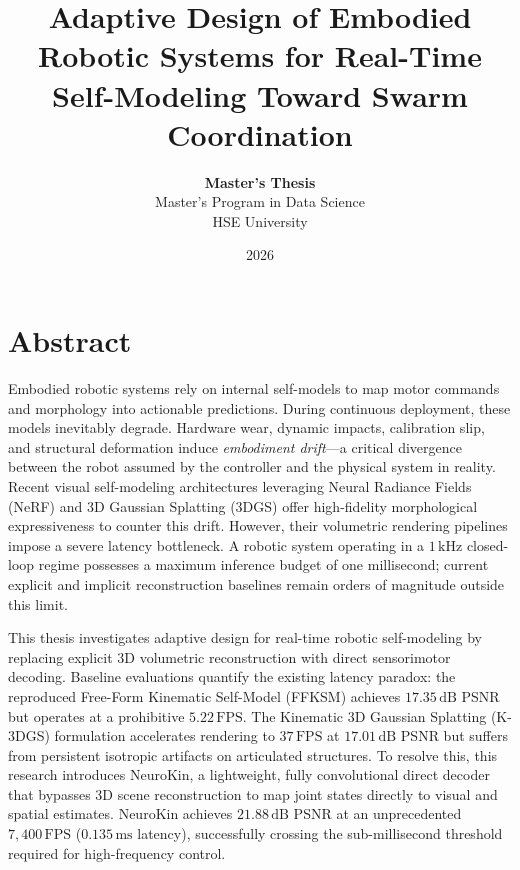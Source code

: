 \documentclass[12pt,a4paper,oneside]{report}
\title{
    \vspace{2cm}
    \textbf{\Large Adaptive Design of Embodied Robotic Systems for Real-Time Self-Modeling Toward Swarm Coordination}
    \vspace{1cm}
}
\author{
    \textbf{Master's Thesis} \\
    Master's Program in Data Science \\
    HSE University 
}
\date{\vspace{1cm} 2026}
\begin{document}
\maketitle
\clearpage
{}

\chapter*{Abstract}

Embodied robotic systems rely on internal self-models to map motor commands and morphology into actionable predictions. During continuous deployment, these models inevitably degrade. Hardware wear, dynamic impacts, calibration slip, and structural deformation induce \textit{embodiment drift}---a critical divergence between the robot assumed by the controller and the physical system in reality. Recent visual self-modeling architectures leveraging Neural Radiance Fields (NeRF) and 3D Gaussian Splatting (3DGS) offer high-fidelity morphological expressiveness to counter this drift. However, their volumetric rendering pipelines impose a severe latency bottleneck. A robotic system operating in a $1\,\mathrm{kHz}$ closed-loop regime possesses a maximum inference budget of one millisecond; current explicit and implicit reconstruction baselines remain orders of magnitude outside this limit.

This thesis investigates adaptive design for real-time robotic self-modeling by replacing explicit 3D volumetric reconstruction with direct sensorimotor decoding. Baseline evaluations quantify the existing latency paradox: the reproduced Free-Form Kinematic Self-Model (FFKSM) achieves $17.35\,\mathrm{dB}$ PSNR but operates at a prohibitive $5.22\,\mathrm{FPS}$. The Kinematic 3D Gaussian Splatting (K-3DGS) formulation accelerates rendering to $37\,\mathrm{FPS}$ at $17.01\,\mathrm{dB}$ PSNR but suffers from persistent isotropic artifacts on articulated structures. To resolve this, this research introduces NeuroKin, a lightweight, fully convolutional direct decoder that bypasses 3D scene reconstruction to map joint states directly to visual and spatial estimates. NeuroKin achieves $21.88\,\mathrm{dB}$ PSNR at an unprecedented $7{,}400\,\mathrm{FPS}$ ($0.135\,\mathrm{ms}$ latency), successfully crossing the sub-millisecond threshold required for high-frequency control.
\end{document}
